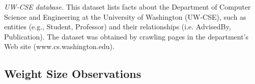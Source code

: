 \documentclass[twoside,leqno,twocolumn]{article}
\begin{document}


\emph{UW-CSE database.} This dataset lists facts about the Department of Computer Science and Engineering at the University of Washington (UW-CSE), such as entities (e.g., Student, Professor) and their relationships (i.e. AdvisedBy, Publication).
The dataset was obtained  by crawling pages in the department's Web site (www.cs.washington.edu). 


\subsection{Weight Size Observations}
\end{document}
